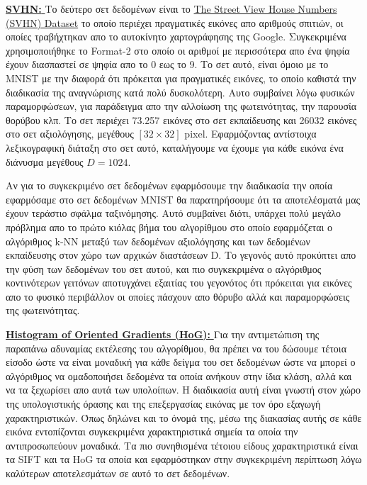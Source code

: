 \par
\href{http://ufldl.stanford.edu/housenumbers/}{\textbf{\textlatin{SVHN: }}}Το δεύτερο σετ δεδομένων είναι το \href{http://ufldl.stanford.edu/housenumbers/}{\textlatin{The Street View House Numbers (SVHN) Dataset}} το οποίο περιέχει πραγματικές εικόνες απο αριθμούς σπιτιών, οι οποίες τραβήχτηκαν απο το αυτοκίνητο χαρτογράφησης της \textlatin{Google}. Συγκεκριμένα χρησιμοποιήθηκε το \textlatin{Format-2} στο οποίο οι αριθμοί με περισσότερα απο ένα ψηφία έχουν διασπαστεί σε ψηφία απο το 0 εως το 9. Το σετ αυτό, είναι όμοιο με το \textlatin{MNIST} με την διαφορά ότι πρόκειται για πραγματικές εικόνες, το οποίο καθιστά την διαδικασία της αναγνώρισης κατά πολύ δυσκολότερη. Αυτο συμβαίνει λόγω φυσικών παραμορφώσεων, για παράδειγμα απο την αλλοίωση της φωτεινότητας, την παρουσία θορύβου κλπ. Το σετ περιέχει 73.257 εικόνες στο σετ εκπαίδευσης και 26032 εικόνες στο σετ αξιολόγησης, μεγέθους $[32 \times 32]$ \textlatin{pixel}. Εφαρμόζοντας αντίστοιχα λεξικογραφική διάταξη στο σετ αυτό, καταλήγουμε να έχουμε για κάθε εικόνα ένα διάνυσμα μεγέθους $D = 1024$. 
\par
Αν για το συγκεκριμένο σετ δεδομένων εφαρμόσουμε την διαδικασία την οποία εφαρμόσαμε στο σετ δεδομένων \textlatin{MNIST} θα παρατηρήσουμε ότι τα αποτελέσματά μας έχουν τεράστιο σφάλμα ταξινόμησης. Αυτό συμβαίνει διότι, υπάρχει πολύ μεγάλο πρόβλημα απο το πρώτο κιόλας βήμα του αλγορίθμου στο οποίο εφαρμόζεται ο αλγόριθμος \textlatin{k-NN} μεταξύ των δεδομένων αξιολόγησης και των δεδομένων εκπαίδευσης στον χώρο των αρχικών διαστάσεων \textlatin{D}. Το γεγονός αυτό προκύπτει απο την φύση των δεδομένων του σετ αυτού, και πιο συγκεκριμένα ο αλγόριθμος κοντινότερων γειτόνων αποτυγχάνει εξαιτίας του γεγονότος ότι πρόκειται για εικόνες απο το φυσικό περιβάλλον οι οποίες πάσχουν απο θόρυβο αλλά και παραμορφώσεις της φωτεινότητας. 
\par
\href{https://en.wikipedia.org/wiki/Histogram_of_oriented_gradients}{\textbf{\textlatin{Histogram of Oriented Gradients (HoG): }}} Για την αντιμετώπιση της παραπάνω αδυναμίας εκτέλεσης του αλγορίθμου, θα πρέπει να του δώσουμε τέτοια είσοδο ώστε να είναι μοναδική για κάθε δείγμα του σετ δεδομένων ώστε να μπορεί ο αλγόριθμος να ομαδοποιήσει δεδομένα τα οποία ανήκουν στην ίδια κλάση, αλλά και να τα ξεχωρίσει απο αυτά των υπολοίπων. Η διαδικασία αυτή είναι γνωστή στον χώρο της υπολογιστικής όρασης και της επεξεργασίας εικόνας με τον όρο εξαγωγή χαρακτηριστικών. Όπως δηλώνει και το όνομά της, μέσω της διακασίας αυτής σε κάθε εικόνα εντοπίζονται συγκεκριμένα χαρακτηριστικά σημεία τα οποία την αντιπροσωπεύουν μοναδικά. Τα πιο συνηθισμένα τέτοιου είδους χαρακτηριστικά είναι τα \textlatin{SIFT} και τα \textlatin{HoG} τα οποία και εφαρμόστηκαν στην συγκεκριμένη περίπτωση λόγω καλύτερων αποτελεσμάτων σε αυτό το σετ δεδομένων. 
